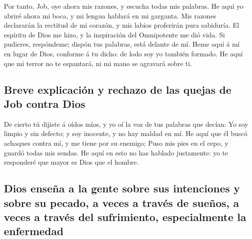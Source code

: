  Por tanto, Job, oye ahora mis razones, y escucha todas mis
palabras.  He aquí yo abriré ahora mi boca, y mi lengua
hablará en mi garganta.  Mis razones declararán la rectitud
de mi corazón, y mis labios proferirán pura sabiduría.  El
espíritu de Dios me hizo, y la inspiración del Omnipotente me dió vida.
 Si pudieres, respóndeme; dispón tus palabras, está delante
de mí.  Heme aquí á mí en lugar de Dios, conforme á tu
dicho: de lodo soy yo también formado.  He aquí que mi
terror no te espantará, ni mi mano se agravará sobre ti.

\hypertarget{breve-explicaciuxf3n-y-rechazo-de-las-quejas-de-job-contra-dios}{%
\subsection{Breve explicación y rechazo de las quejas de Job contra
Dios}\label{breve-explicaciuxf3n-y-rechazo-de-las-quejas-de-job-contra-dios}}

 De cierto tú dijiste á oídos míos, y yo oí la voz de tus
palabras que decían:  Yo soy limpio y sin defecto; y soy
inocente, y no hay maldad en mí.  He aquí que él buscó
achaques contra mí, y me tiene por su enemigo;  Puso mis
pies en el cepo, y guardó todas mis sendas.  He aquí en
esto no has hablado justamente: yo te responderé que mayor es Dios que
el hombre.

\hypertarget{dios-enseuxf1a-a-la-gente-sobre-sus-intenciones-y-sobre-su-pecado-a-veces-a-travuxe9s-de-sueuxf1os-a-veces-a-travuxe9s-del-sufrimiento-especialmente-la-enfermedad}{%
\subsection{Dios enseña a la gente sobre sus intenciones y sobre su
pecado, a veces a través de sueños, a veces a través del sufrimiento,
especialmente la
enfermedad}\label{dios-enseuxf1a-a-la-gente-sobre-sus-intenciones-y-sobre-su-pecado-a-veces-a-travuxe9s-de-sueuxf1os-a-veces-a-travuxe9s-del-sufrimiento-especialmente-la-enfermedad}}

